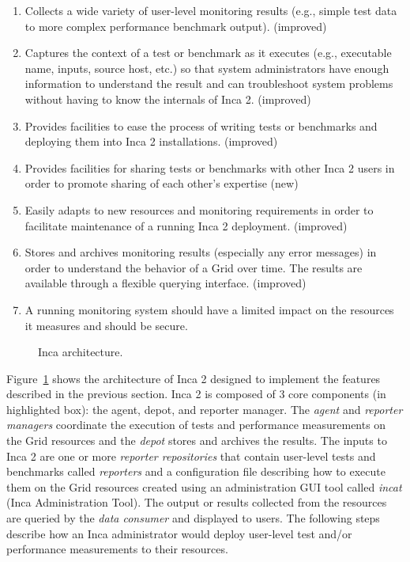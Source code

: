 \documentclass[times,10pt,twocolumn]{article}
\begin{document}
\begin{enumerate}

\item Collects a wide variety of user-level monitoring results (e.g., simple
test data to more complex performance benchmark output).  (improved) 

\item Captures the context of a test or benchmark as it executes (e.g.,
executable name, inputs, source host, etc.) so that system administrators have
enough information to understand the result and can troubleshoot system
problems without having to know the internals of Inca 2. (improved)

\item Provides facilities to ease the process of writing tests or benchmarks
and deploying them into Inca 2 installations. (improved)

\item Provides facilities for sharing tests or benchmarks with other Inca 2
users in order to promote sharing of each other's expertise (new)

\item Easily adapts to new resources and monitoring requirements in order to
facilitate maintenance of a running Inca 2 deployment. (improved)

\item Stores and archives monitoring results (especially any error messages) 
in order to understand the behavior of a Grid over time. The results
are available through a flexible querying interface. (improved)

\item A running monitoring system should have a limited impact on the resources
it measures and should be secure.
\end{enumerate}


\begin{figure}[htb]
  \centering
  \mbox{}
  \caption{\label{arch_fig} Inca architecture.}
\end{figure}

Figure~\ref{arch_fig} shows the architecture of Inca 2 designed to implement
the features described in the previous section.  Inca 2 is composed of 3 core
components (in highlighted box):  the agent, depot, and reporter manager.
The \textit{agent} and \textit{reporter managers} coordinate the execution of
tests and performance measurements on the Grid resources and the
\textit{depot} stores and archives the results.  The inputs to Inca 2 are one
or more \textit{reporter repositories} that contain user-level tests and
benchmarks called \textit{reporters} and a configuration file describing how
to execute them on the Grid resources created using an administration GUI tool
called \textit{incat} (Inca Administration Tool).  The output or results
collected from the resources are queried by the \textit{data consumer} and
displayed to users.  The following steps describe how an Inca administrator
would deploy user-level test and/or performance measurements to their
resources.
\end{document}
